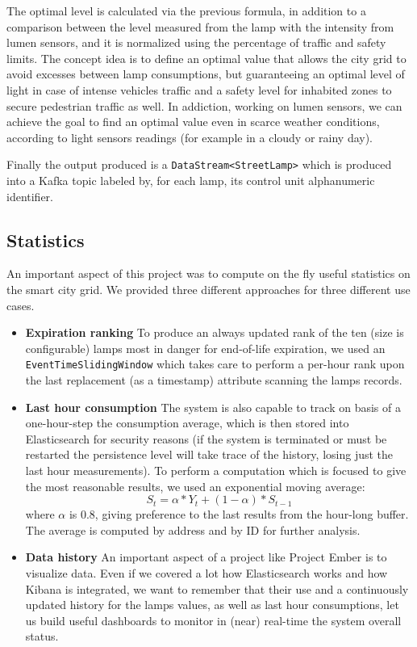 The optimal level is calculated via the previous formula, in addition to a comparison between the level measured from the lamp with the intensity from lumen sensors, and it is normalized using the percentage of traffic and safety limits. The concept idea is to define an optimal value that allows the city grid to avoid excesses between lamp consumptions, but guaranteeing an optimal level of light in case of intense vehicles traffic and a safety level for inhabited zones to secure pedestrian traffic as well. In addiction, working on lumen sensors, we can achieve the goal to find an optimal value even in scarce weather conditions, according to light sensors readings (for example in a cloudy or rainy day).

Finally the output produced is a \texttt{DataStream<StreetLamp>} which is produced into a Kafka topic labeled by, for each lamp, its control unit alphanumeric identifier.

\subsection*{Statistics}
An important aspect of this project was to compute on the fly useful statistics on the smart city grid. We provided three different approaches for three different use cases.
\begin{itemize}
	\item \textbf{Expiration ranking} To produce an always updated rank of the ten (size is configurable) lamps most in danger for end-of-life expiration, we used an \texttt{EventTimeSlidingWindow} which takes care to perform a per-hour rank upon the last replacement (as a timestamp) attribute scanning the lamps records.
	\item \textbf{Last hour consumption} The system is also capable to track on basis of a one-hour-step the consumption average, which is then stored into Elasticsearch for security reasons (if the system is terminated or must be restarted the persistence level will take trace of the history, losing just the last hour measurements). To perform a computation which is focused to give the most reasonable results, we used an exponential moving average:
$$S_t = \alpha*Y_t + (1 - \alpha)*S_{t-1}$$
where $\alpha$ is 0.8, giving preference to the last results from the hour-long buffer. The average is computed by address and by ID for further analysis.
	\item \textbf{Data history} An important aspect of a project like Project Ember is to visualize data. Even if we covered a lot how Elasticsearch works and how Kibana is integrated, we want to remember that their use and a continuously updated history for the lamps values, as well as last hour consumptions, let us build useful dashboards to monitor in (near) real-time the system overall status.
\end{itemize}

